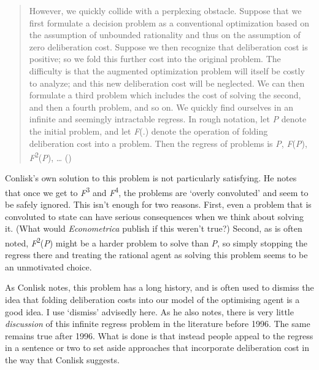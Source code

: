 \documentclass[
  11pt,
  letterpaper,
  DIV=11,
  numbers=noendperiod,
  twoside]{scrartcl}
\begin{document}
\begin{quote}
However, we quickly collide with a perplexing obstacle. Suppose that we
first formulate a decision problem as a conventional optimization based
on the assumption of unbounded rationality and thus on the assumption of
zero deliberation cost. Suppose we then recognize that deliberation cost
is positive; so we fold this further cost into the original problem. The
difficulty is that the augmented optimization problem will itself be
costly to analyze; and this new deliberation cost will be neglected. We
can then formulate a third problem which includes the cost of solving
the second, and then a fourth problem, and so on. We quickly find
ourselves in an infinite and seemingly intractable regress. In rough
notation, let \emph{P} denote the initial problem, and let \emph{F}(.)
denote the operation of folding deliberation cost into a problem. Then
the regress of problems is \emph{P}, \emph{F}(\emph{P}),
\emph{F}\textsuperscript{2}(\emph{P}), \ldots{}
()
\end{quote}

Conlisk's own solution to this problem is not particularly satisfying.
He notes that once we get to \emph{F}\textsuperscript{3} and
\emph{F}\textsuperscript{4}, the problems are `overly convoluted' and
seem to be safely ignored. This isn't enough for two reasons. First,
even a problem that is convoluted to state can have serious consequences
when we think about solving it. (What would \emph{Econometrica} publish
if this weren't true?) Second, as is often noted,
\emph{F}\textsuperscript{2}(\emph{P}) might be a harder problem to solve
than \emph{P}, so simply stopping the regress there and treating the
rational agent as solving this problem seems to be an unmotivated
choice.

As Conlisk notes, this problem has a long history, and is often used to
dismiss the idea that folding deliberation costs into our model of the
optimising agent is a good idea. I use `dismiss' advisedly here. As he
also notes, there is very little \emph{discussion} of this infinite
regress problem in the literature before 1996. The same remains true
after 1996. What is done is that instead people appeal to the regress in
a sentence or two to set aside approaches that incorporate deliberation
cost in the way that Conlisk suggests.
\end{document}
